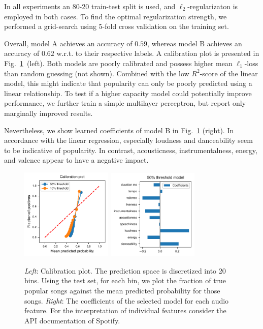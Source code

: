 \documentclass{article}
\begin{document}
In all experiments an 80-20 train-test split is used, and $\ell_2$-regularizaton is employed in both cases. To find the optimal regularization strength, we performed a grid-search using 5-fold cross validation on the training set.

Overall, model A achieves an accuracy of $0.59$, whereas model B achieves an accuracy of $0.62$ w.r.t. to their respective labels.
A calibration plot is presented in Fig.~\ref{fig:logis_eval}~(left). 
Both models are poorly calibrated and possess higher mean $\ell_1$-loss than random guessing (not shown). Combined with the low $R^2$-score of the linear model, this might indicate that popularity can only be poorly predicted using a linear relationship. To test if a higher capacity model could potentially improve performance, we further train a simple multilayer perceptron, but report only marginally improved results.

Nevertheless, we show learned coefficients of model B in Fig.~\ref{fig:logis_eval} (right). In accordance with the linear regression, especially loudness and danceability seem to be indicative of popularity. In contrast, acousticness, instrumentalness, energy, and valence appear to have a negative impact.

\begin{figure}
  \centering
  \includegraphics[width=0.39\textwidth]{../figures/calibration_combined.pdf}
  \qquad
  \includegraphics[width=0.39\textwidth]{../figures/logistic_coefs_50_threshold_model.pdf}
  \caption{\textit{Left}: Calibration plot. The prediction space is discretized into \num{20} bins. Using the test set, for each bin, we plot the fraction of true popular songs against the mean predicted probability for those songs. \textit{Right}: The coefficients of the selected model for each audio feature. For the interpretation of individual features consider the API documentation of Spotify.}
  \label{fig:logis_eval}
\end{figure}
  
\end{document}
